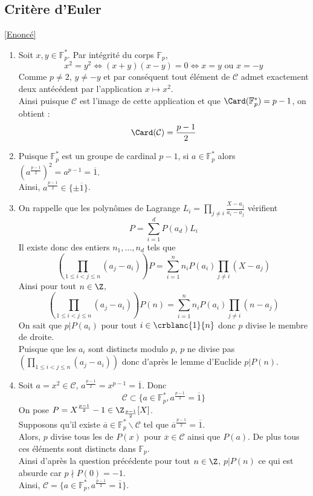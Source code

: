 \documentclass[8pt]{book}
\begin{document}
	\subsection{Critère d'Euler}
	\label{Critère d'Euler corrigé}
	\textcolor{blue}{\hyperref[Critère d'Euler]{[Enoncé]}}\\
	\begin{enumerate}[leftmargin=*]
		\item Soit $x,y\in \mathbb F_p^*$. Par intégrité du corps $\mathbb F_p$,\\
		\[x^2=y^2\Leftrightarrow (x+y)(x-y)=0\Leftrightarrow x=y \text{ ou } x=-y\]
		Comme $p\ne 2$, $y\ne -y$ et par conséquent tout élément de $\mathcal C$ admet exactement deux antécédent par l'application $x\mapsto x^2$.\\
		Ainsi puisque $\mathcal C$ est l'image de cette application et que $\Card(\mathbb F_p^*)=p-1$, on obtient : \[\Card(\mathcal C)=\frac{p-1}{2}\]
		\item Puisque $\mathbb F_p^*$ est un groupe de cardinal $p-1$, si $a\in \mathbb F_p^*$ alors $\left(a^{\frac{p-1}{2}}\right)^2=a^{p-1}=\overline 1$.\\
		Ainsi, $a^{\frac{p-1}{2}}\in\{\pm\overline 1\}$.
		\item On rappelle que les polynômes de Lagrange $L_i=\displaystyle\prod_{j\ne i}\frac{X-a_j}{a_i-a_j}$ vérifient \[P=\sum_{i=1}^{d}P(a_d)L_i\]
		Il existe donc des entiers $n_1,\dots,n_d$ tels que 
		\[\left(\prod_{1\leq i<j\leq n}(a_j-a_i)\right)P=\sum_{i=1}^nn_iP(a_i)\prod_{j\ne i}(X-a_j)\]
		Ainsi pour tout $n\in\Z$, \[\left(\prod_{1\leq i<j\leq n}(a_j-a_i)\right)P(n)=\sum_{i=1}^nn_iP(a_i)\prod_{j\ne i}(n-a_j)\]
		On sait que $p|P(a_i)$ pour tout $i\in\crblanc{1}{n}$ donc $p$ divise le membre de droite.\\
		Puisque que les $a_i$ sont distincts modulo $p$, $p$ ne divise pas $\left(\displaystyle\prod_{1\leq i<j\leq n}(a_j-a_i)\right)$ donc d'après le lemme d'Euclide $p|P(n)$.
		\item Soit $a=x^2\in\mathcal C$, $a^{\frac{p-1}{2}}=x^{p-1}=\overline 1$.
		Donc \[\mathcal C\subset\{a\in\mathbb F_p^*,a^{\frac{p-1}{2}}=\overline 1\}\]
		On pose $P=X^{\frac{p-1}{2}}-1\in \Z_{\frac{p-1}{2}}[X]$.\\
		Supposons qu'il existe $\overline a\in\mathbb F_p^*\backslash\mathcal C$ tel que $\overline{a}^{\frac{p-1}{2}}=\overline 1$.\\
		Alors, $p$ divise tous les de $P(x)$ pour $\overline x\in \mathcal C$ ainsi que $P(a)$. De plus tous ces éléments sont distincts dans $\mathbb F_p$.\\
		Ainsi d'après la question précédente pour tout $n\in\Z$, $p|P(n)$ ce qui est absurde car $p\nmid P(0)=-1$.\\
		Ainsi, $\mathcal C=\{a\in\mathbb F_p^*,a^{\frac{p-1}{2}}=\overline 1\}$.
	\end{enumerate}
	
\end{document}

